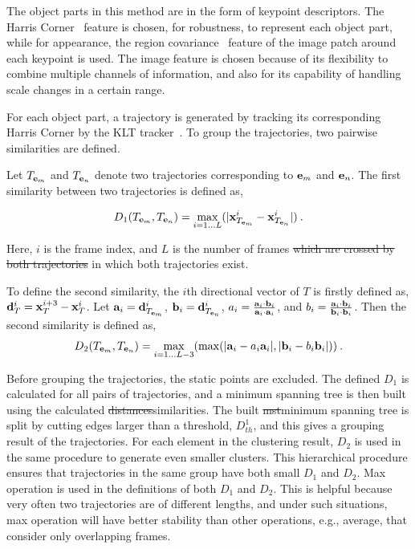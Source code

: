 \documentclass{mva2011}
\begin{document}
The object parts in this method are in the form of keypoint descriptors. The Harris Corner~\cite{harris} feature is chosen, for robustness, to represent each object part, while for appearance, the region covariance~\cite{regionc} feature of the image patch around each keypoint is used. The image feature is chosen because of its flexibility to combine multiple channels of information, and also for its capability of handling scale changes in a certain range.

For each object part, a trajectory is generated by tracking its corresponding Harris Corner by the KLT tracker~\cite{ij2}. To group the trajectories, two pairwise similarities are defined.

Let $T_{{\bf{e}}_m}$ and $T_{{\bf{e}}_n}$ denote two trajectories corresponding to ${{\bf{e}}_m}$ and ${{\bf{e}}_n}$. The first similarity between two trajectories is defined as,

\[
 {D_1}(T_{{\bf{e}}_m},T_{{\bf{e}}_n}) = \mathop {\max }\limits_{i=1...L} (|{\bf{x}}^i_{T_{{\bf{e}}_m}}-{\bf{x}}^i_{T_{{\bf{e}}_n}}|)\:.
\]

Here,  $i$ is the frame index, and $L$ is   the number of frames \sout{which are crossed by both trajectories}{\color{red} in which both trajectories exist}.

To define the second similarity, the $i$th directional vector of $T$ is firstly defined as, ${\bf{d}}^i_T={\bf{x}}^{i+3}_{T}-{\bf{x}}^i_{T}$. Let ${\bf{a}}_i={\bf{d}}^i_{T_{{\bf{e}}_m}}$, ${\bf{b}}_i={\bf{d}}^i_{T_{{\bf{e}}_n}}$, $a_i=\frac{{{{\bf{a}}_i}\cdot{{\bf{b}}_i}}}{{{{\bf{a}}_i}\cdot{{\bf{a}}_i}}}$, and $b_i=\frac{{{{\bf{a}}_i}\cdot{{\bf{b}}_i}}}{{{{\bf{b}}_i}\cdot{{\bf{b}}_i}}}$. Then the second similarity is defined as,
\[
{D_2}(T_{{\bf{e}}_m},T_{{\bf{e}}_n})= \mathop {\max }\limits_{i=1...L-3} (\max (|{{\bf{a}}_i} - a_i {{\bf{a}}_i}|,|{{\bf{b}}_i} - b_i{{\bf{b}}_i}|))\:.
\]



Before grouping the trajectories, the static points are excluded.   The defined $D_1$ is calculated for all pairs of trajectories, and a minimum spanning tree is then built using the calculated \sout{distances}{\color{red}similarities}. The built \sout{mst}{\color{red}minimum spanning tree} is split by cutting edges larger than a threshold, $D^1_{th}$, and this gives a grouping result of the trajectories. For each element in the clustering result, $D_2$  is used in the same procedure to generate even smaller clusters. This hierarchical procedure ensures that trajectories in the same group have both small $D_1$ and $D_2$. {\color{red}Max operation is used in the definitions of both $D_1$ and $D_2$. This is helpful because very often two trajectories are of different
lengths, and under such situations, max operation will have better stability than other operations, e.g., average, that consider only overlapping frames.}
\end{document}
